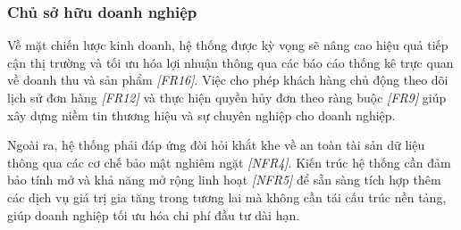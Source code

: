\subsubsection{Chủ sở hữu doanh nghiệp}

Về mặt chiến lược kinh doanh, hệ thống được kỳ vọng sẽ nâng cao hiệu quả tiếp cận thị trường và tối ưu hóa lợi nhuận thông qua các báo cáo thống kê trực quan về doanh thu và sản phẩm \textit{[FR16]}. Việc cho phép khách hàng chủ động theo dõi lịch sử đơn hàng \textit{[FR12]} và thực hiện quyền hủy đơn theo ràng buộc \textit{[FR9]} giúp xây dựng niềm tin thương hiệu và sự chuyên nghiệp cho doanh nghiệp.

Ngoài ra, hệ thống phải đáp ứng đòi hỏi khắt khe về an toàn tài sản dữ liệu thông qua các cơ chế bảo mật nghiêm ngặt \textit{[NFR4]}. Kiến trúc hệ thống cần đảm bảo tính mở và khả năng mở rộng linh hoạt \textit{[NFR5]} để sẵn sàng tích hợp thêm các dịch vụ giá trị gia tăng trong tương lai mà không cần tái cấu trúc nền tảng, giúp doanh nghiệp tối ưu hóa chi phí đầu tư dài hạn.